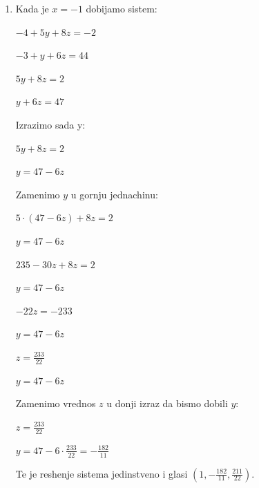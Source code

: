 \documentclass[a4paper,12pt]{article}
\begin{document}
\begin{enumerate}[1.]
\begin{enumerate}[1)]
\item Kada je $x = -1$ dobijamo sistem:
\begin{center}
\par $-4 + 5y +8z = -2$
\par $-3 + y + 6z = 44$
\end{center}
\begin{center}
\par $5y +8z = 2$
\par $y + 6z = 47$
\end{center}
\par Izrazimo sada y:
\begin{center}
\par $5y +8z = 2$
\par $y = 47 - 6z$
\end{center}
\par Zamenimo $y$ u gornju jednachinu:
\begin{center}
\par $5 \cdot (47 - 6z) +8z = 2$
\par $y = 47 - 6z$
\end{center}
\begin{center}
\par $235-30z +8z = 2$
\par $y = 47 - 6z$
\end{center}
\begin{center}
\par $-22z=-233$
\par $y = 47 - 6z$
\end{center}
\begin{center}
\par $z = \frac{233}{22}$
\par $y = 47 - 6z$
\end{center}
\par Zamenimo vrednos $z$ u donji izraz da bismo dobili $y$:
\begin{center}
\par $z = \frac{233}{22}$
\par $y = 47 - 6 \cdot \frac{233}{22} = - \frac{182}{11}$
\end{center}
\par Te je reshenje sistema jedinstveno i glasi $(1,-\frac{182}{11}, \frac{211}{22})$.


\end{enumerate}
\end{enumerate}
\end{document}
